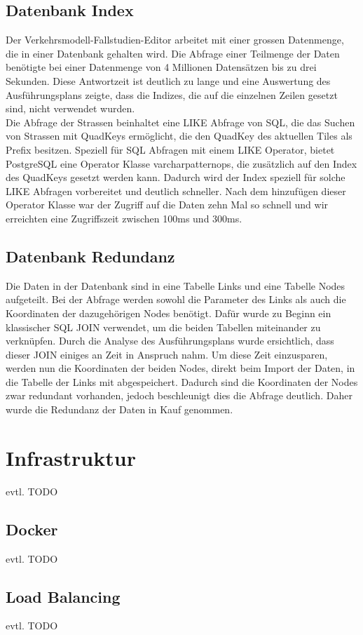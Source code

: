 \subsection{Datenbank Index}
Der Verkehrsmodell-Fallstudien-Editor arbeitet mit einer grossen Datenmenge, die in einer Datenbank gehalten wird. Die Abfrage einer Teilmenge der Daten benötigte bei einer Datenmenge von 4 Millionen Datensätzen bis zu drei Sekunden. Diese Antwortzeit ist deutlich zu lange und eine Auswertung des Ausführungsplans zeigte, dass die Indizes, die auf die einzelnen Zeilen gesetzt sind, nicht verwendet wurden.\\
Die Abfrage der Strassen beinhaltet eine LIKE Abfrage von SQL, die das Suchen von Strassen mit QuadKeys ermöglicht, die den QuadKey des aktuellen Tiles als Prefix besitzen. Speziell für SQL Abfragen mit einem LIKE Operator, bietet PostgreSQL eine Operator Klasse \glqq{}varchar\textunderscore pattern\textunderscore ops\grqq{}, die zusätzlich auf den Index des QuadKeys gesetzt werden kann. Dadurch wird der Index speziell für solche LIKE Abfragen vorbereitet und deutlich schneller. Nach dem hinzufügen dieser Operator Klasse war der Zugriff auf die Daten zehn Mal so schnell und wir erreichten eine Zugriffszeit zwischen 100ms und 300ms.
\subsection{Datenbank Redundanz} \label{ch:redundance}
Die Daten in der Datenbank sind in eine Tabelle \glqq{}Links\grqq{} und eine Tabelle \glqq{}Nodes\grqq{} aufgeteilt. Bei der Abfrage werden sowohl die Parameter des Links als auch die Koordinaten der dazugehörigen Nodes benötigt. Dafür wurde zu Beginn ein klassischer SQL JOIN verwendet, um die beiden Tabellen miteinander zu verknüpfen. Durch die Analyse des Ausführungsplans wurde ersichtlich, dass dieser JOIN einiges an Zeit in Anspruch nahm. Um diese Zeit einzusparen, werden nun die Koordinaten der beiden Nodes, direkt beim Import der Daten, in die Tabelle der Links mit abgespeichert. Dadurch sind die Koordinaten der Nodes zwar redundant vorhanden, jedoch beschleunigt dies die Abfrage deutlich. Daher wurde die Redundanz der Daten in Kauf genommen.
\newpage
\section{Infrastruktur}
evtl. TODO
\subsection{Docker}
evtl. TODO
\subsection{Load Balancing}
evtl. TODO